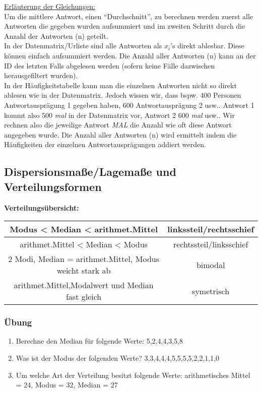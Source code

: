 \underline{Erläuterung der Gleichungen:}\\
Um die mittlere Antwort, einen ``Durchschnitt'', zu berechnen werden zuerst alle Antworten die gegeben wurden aufsummiert und im zweiten Schritt durch die Anzahl der Antworten (n) geteilt.\\

In der Datenmatrix/Urliste sind alle Antworten als $x_i$'s direkt ablesbar. Diese können einfach aufsummiert werden. Die Anzahl aller Antworten (n) kann an der ID des letzten Falls abgelesen werden (sofern keine Fälle dazwischen herausgefiltert wurden).\\

In der Häufigkeitstabelle kann man die einzelnen Antworten nicht so direkt ablesen wie in der Datenmatrix. Jedoch wissen wir, dass bspw. 400 Personen Antwortausprägung 1 gegeben haben, 600 Antwortausprägung 2 usw.. Antwort 1 kommt also 500 \textit{mal} in der Datenmatrix vor, Antwort 2 600 \textit{mal} usw.. Wir rechnen also die jeweilige Antwort \textit{MAL} die Anzahl wie oft diese Antwort angegeben wurde. Die Anzahl aller Antworten (n) wird ermittelt indem die Häufigkeiten der einzelnen Antwortausprägungen addiert werden.

\subsection{Dispersionsmaße/Lagemaße und Verteilungsformen}
\textbf{Verteilungsübersicht:}\\
\begin{tabular}{|c|c|}
\hline
    Modus < Median < arithmet.Mittel & linkssteil/rechtsschief
\\ \hline
    arithmet.Mittel < Median < Modus & rechtssteil/linksschief
\\ \hline
    2 Modi, Median = arithmet.Mittel, Modus weicht stark ab & bimodal
\\ \hline
    arithmet.Mittel,Modalwert und Median fast gleich & symetrisch\\
  \hline
\end{tabular}


\subsubsection{Übung}
\begin{enumerate}
\item Berechne den Median für folgende Werte: 5,2,4,4,3,5,8 
\item Was ist der Modus der folgenden Werte? 3,3,4,4,4,5,5,5,5,2,2,1,1,0 
\item Um welche Art der Verteilung besitzt folgende Werte: arithmetisches Mittel =  24, Modus = 32, Median = 27 
\end{enumerate}
